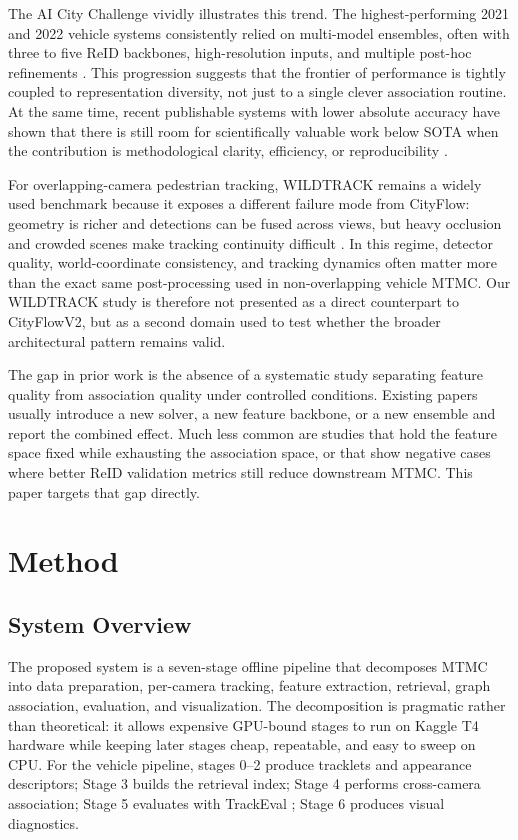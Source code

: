 \documentclass{ieeeaccess}
\begin{document}
The AI City Challenge vividly illustrates this trend. The highest-performing 2021 and 2022 vehicle systems consistently relied on multi-model ensembles, often with three to five ReID backbones, high-resolution inputs, and multiple post-hoc refinements \cite{aicity2022,aic22winner,aic22sta}. This progression suggests that the frontier of performance is tightly coupled to representation diversity, not just to a single clever association routine. At the same time, recent publishable systems with lower absolute accuracy have shown that there is still room for scientifically valuable work below SOTA when the contribution is methodological clarity, efficiency, or reproducibility \cite{scorebased,realtimeaccess}.

For overlapping-camera pedestrian tracking, WILDTRACK remains a widely used benchmark because it exposes a different failure mode from CityFlow: geometry is richer and detections can be fused across views, but heavy occlusion and crowded scenes make tracking continuity difficult \cite{wildtrack}. In this regime, detector quality, world-coordinate consistency, and tracking dynamics often matter more than the exact same post-processing used in non-overlapping vehicle MTMC. Our WILDTRACK study is therefore not presented as a direct counterpart to CityFlowV2, but as a second domain used to test whether the broader architectural pattern remains valid.

The gap in prior work is the absence of a systematic study separating feature quality from association quality under controlled conditions. Existing papers usually introduce a new solver, a new feature backbone, or a new ensemble and report the combined effect. Much less common are studies that hold the feature space fixed while exhausting the association space, or that show negative cases where better ReID validation metrics still reduce downstream MTMC. This paper targets that gap directly.

\section{Method}
\subsection{System Overview}
The proposed system is a seven-stage offline pipeline that decomposes MTMC into data preparation, per-camera tracking, feature extraction, retrieval, graph association, evaluation, and visualization. The decomposition is pragmatic rather than theoretical: it allows expensive GPU-bound stages to run on Kaggle T4 hardware while keeping later stages cheap, repeatable, and easy to sweep on CPU. For the vehicle pipeline, stages 0--2 produce tracklets and appearance descriptors; Stage 3 builds the retrieval index; Stage 4 performs cross-camera association; Stage 5 evaluates with TrackEval \cite{trackeval,hota}; Stage 6 produces visual diagnostics.
\end{document}
